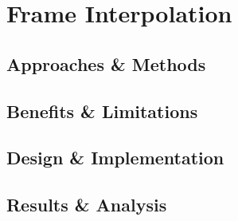 \chapter{Frame Interpolation}
\label{chapterlabel6}
\section{Approaches \& Methods}
\section{Benefits \& Limitations}
\section{Design \& Implementation}
\section{Results \& Analysis}
\blindtext
